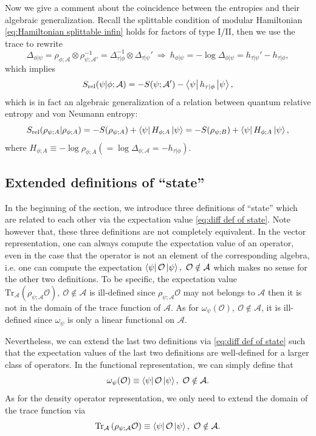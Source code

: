 \documentclass[a4paper,11pt]{article}
\newcommand{\diracprod}[3]{\left\langle  #1 \vphantom{#2#3} \right|#2 \left| #3 \vphantom{#1#2} \right\rangle } %
\renewcommand{\=}[1]{\stackrel{#1}{=}} %
\def\A{\mathcal{A}}
\def\O{\mathcal{O}}
\def\Tr{\text{Tr}}
\def\Srel{S_{\text{rel}}}
\begin{document}
Now we give a comment about the coincidence between the entropies and their algebraic generalization. Recall the splittable condition of modular Hamiltonian \eqref{eq:Hamiltonian splittable infin} holds for factors of type I/II, then we use the trace to rewrite
\begin{equation}
	\Delta_{\phi|\psi}=\rho_{\phi;\A}\otimes\rho^{-1}_{\psi;\A'}=\Delta^{-1}_{\tau|\phi}\otimes \Delta_{\tau|\psi}'~\Rightarrow~ h_{\phi|\psi}=-\log\Delta_{\phi|\psi}=h_{\tau|\psi}'-h_{\tau|\phi},
\end{equation} 
which implies
\begin{equation}
	\Srel(\psi|\phi;\A)=-S(\psi;\A')-\diracprod{\psi}{h_{\tau|\phi}}{\psi},
\end{equation}
which is in fact an algebraic generalization of a relation between quantum relative entropy and von Neumann entropy:
\begin{equation}
	\Srel(\rho_{\psi;A}|\rho_{\phi;A})=-S(\rho_{\psi;A})+\diracprod{\psi}{H_{\phi;A}}{\psi}=-S(\rho_{\psi;B})+\diracprod{\psi}{H_{\phi;A}}{\psi},
\end{equation}
where $H_{\phi;A}\equiv -\log\rho_{\phi;A} (=\log\Delta_{\phi;\A}=-h_{\tau|\phi})$.

\subsection{Extended definitions of ``state''}\label{sec:extended def}

In the beginning of the section, we introduce three definitions of ``state'' which are related to each other via the expectation value \eqref{eq:diff def of state}. Note however that, these three definitions are not completely equivalent. In the vector representation, one can always compute the expectation value of an operator, even in the case that the operator is not an element of the corresponding algebra, i.e. one can compute the expectation $\diracprod{\psi}{\O}{\psi},~\O\notin\A$ which makes no sense for the other two definitions. To be specific, the expectation value $\Tr_{\A}\left(\rho_{\psi;\A}\O\right),~\O\notin\A$ is ill-defined since $\rho_{\psi;\A}\O$ may not belongs to $\A$ then it is not in the domain of the trace function of $\A$. As for $\omega_\psi(\O),~\O\notin\A$, it is ill-defined since $\omega_\psi$ is only a linear functional on $\A$.

Nevertheless, we can extend the last two definitions via \eqref{eq:diff def of state} such that the expectation values of the last two definitions are well-defined for a larger class of operators. In the functional representation, we can simply define that
\begin{equation}
	\omega_\psi(\O)\equiv \diracprod{\psi}{\O}{\psi},~\O\notin\A.
\end{equation}
As for the density operator representation, we only need to extend the domain of the trace function via
\begin{equation}
	\Tr_{\A}\left(\rho_{\psi;\A}\O\right)\equiv\diracprod{\psi}{\O}{\psi},~\O\notin\A.
\end{equation}
\end{document}
